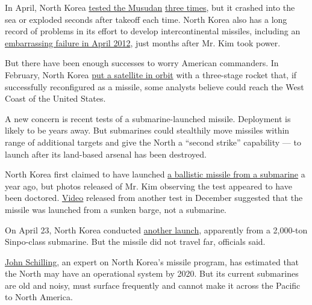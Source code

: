 In April, North Korea
\href{http://www.nytimes.com/2016/04/15/world/asia/north-korea-ballistic-missile-launch-a-failure-pentagon-says.html}{tested
the Musudan}
\href{http://www.nytimes.com/2016/04/29/world/asia/north-korea-missile-test.html}{three
times}, but it crashed into the sea or exploded seconds after takeoff
each time. North Korea also has a long record of problems in its effort
to develop intercontinental missiles, including an
\href{http://www.nytimes.com/2012/04/13/world/asia/north-korea-launches-rocket-defying-world-warnings.html}{embarrassing
failure in April 2012}, just months after Mr. Kim took power.

But there have been enough successes to worry American commanders. In
February, North Korea
\href{http://www.nytimes.com/2016/02/07/world/asia/north-korea-moves-up-rocket-launching-plan.html}{put
a satellite in orbit} with a three-stage rocket that, if successfully
reconfigured as a missile, some analysts believe could reach the West
Coast of the United States.

A new concern is recent tests of a submarine-launched missile.
Deployment is likely to be years away. But submarines could stealthily
move missiles within range of additional targets and give the North a
``second strike'' capability --- to launch after its land-based arsenal
has been destroyed.

North Korea first claimed to have launched
\href{http://www.nytimes.com/2015/05/09/world/asia/north-korea-says-it-test-fired-missile-from-submarine.html}{a
ballistic missile from a submarine} a year ago, but photos released of
Mr. Kim observing the test appeared to have been doctored.
\href{http://www.nytimes.com/2016/01/13/world/asia/north-korea-faked-test-video-group-says.html}{Video}
released from another test in December suggested that the missile was
launched from a sunken barge, not a submarine.

On April 23, North Korea conducted
\href{http://www.nytimes.com/2016/04/24/world/asia/north-korea-fires-ballistic-missile-from-submarine-south-says.html}{another
launch}, apparently from a 2,000-ton Sinpo-class submarine. But the
missile did not travel far, officials said.

\href{http://38north.org/author/john-schilling/}{John Schilling}, an
expert on North Korea's missile program, has estimated that the North
may have an operational system by 2020. But its current submarines are
old and noisy, must surface frequently and cannot make it across the
Pacific to North America.

